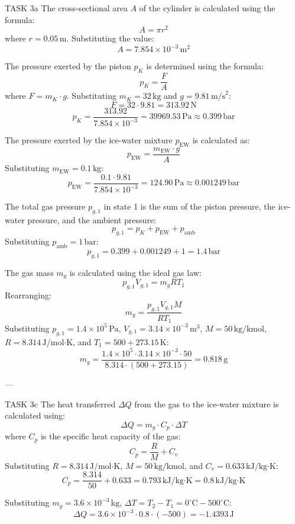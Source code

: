 TASK 3a  
The cross-sectional area \( A \) of the cylinder is calculated using the formula:  
\[
A = \pi r^2
\]  
where \( r = 0.05 \, \text{m} \). Substituting the value:  
\[
A = 7.854 \times 10^{-3} \, \text{m}^2
\]  

The pressure exerted by the piston \( p_K \) is determined using the formula:  
\[
p_K = \frac{F}{A}
\]  
where \( F = m_K \cdot g \). Substituting \( m_K = 32 \, \text{kg} \) and \( g = 9.81 \, \text{m/s}^2 \):  
\[
F = 32 \cdot 9.81 = 313.92 \, \text{N}
\]  
\[
p_K = \frac{313.92}{7.854 \times 10^{-3}} = 39969.53 \, \text{Pa} \approx 0.399 \, \text{bar}
\]  

The pressure exerted by the ice-water mixture \( p_{\text{EW}} \) is calculated as:  
\[
p_{\text{EW}} = \frac{m_{\text{EW}} \cdot g}{A}
\]  
Substituting \( m_{\text{EW}} = 0.1 \, \text{kg} \):  
\[
p_{\text{EW}} = \frac{0.1 \cdot 9.81}{7.854 \times 10^{-3}} = 124.90 \, \text{Pa} \approx 0.001249 \, \text{bar}
\]  

The total gas pressure \( p_{g,1} \) in state 1 is the sum of the piston pressure, the ice-water pressure, and the ambient pressure:  
\[
p_{g,1} = p_K + p_{\text{EW}} + p_{\text{amb}}
\]  
Substituting \( p_{\text{amb}} = 1 \, \text{bar} \):  
\[
p_{g,1} = 0.399 + 0.001249 + 1 = 1.4 \, \text{bar}
\]  

The gas mass \( m_g \) is calculated using the ideal gas law:  
\[
p_{g,1} V_{g,1} = m_g R T_1
\]  
Rearranging:  
\[
m_g = \frac{p_{g,1} V_{g,1} M}{R T_1}
\]  
Substituting \( p_{g,1} = 1.4 \times 10^5 \, \text{Pa} \), \( V_{g,1} = 3.14 \times 10^{-3} \, \text{m}^3 \), \( M = 50 \, \text{kg/kmol} \), \( R = 8.314 \, \text{J/mol·K} \), and \( T_1 = 500 + 273.15 \, \text{K} \):  
\[
m_g = \frac{1.4 \times 10^5 \cdot 3.14 \times 10^{-3} \cdot 50}{8.314 \cdot (500 + 273.15)} = 0.818 \, \text{g}
\]  

---

TASK 3c  
The heat transferred \( \Delta Q \) from the gas to the ice-water mixture is calculated using:  
\[
\Delta Q = m_g \cdot C_p \cdot \Delta T
\]  
where \( C_p \) is the specific heat capacity of the gas:  
\[
C_p = \frac{R}{M} + C_v
\]  
Substituting \( R = 8.314 \, \text{J/mol·K} \), \( M = 50 \, \text{kg/kmol} \), and \( C_v = 0.633 \, \text{kJ/kg·K} \):  
\[
C_p = \frac{8.314}{50} + 0.633 = 0.793 \, \text{kJ/kg·K} = 0.8 \, \text{kJ/kg·K}
\]  

Substituting \( m_g = 3.6 \times 10^{-3} \, \text{kg} \), \( \Delta T = T_2 - T_1 = 0^\circ\text{C} - 500^\circ\text{C} \):  
\[
\Delta Q = 3.6 \times 10^{-3} \cdot 0.8 \cdot (-500) = -1.4393 \, \text{J}
\]  

